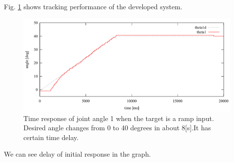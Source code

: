 \documentclass{llncs}
\begin{document}
Fig. \ref{fig:angle_tracking} shows tracking performance of the developed system.
\begin{figure}[tb]
	\centering
	\includegraphics[width=.70\textwidth]{./figure/plot/0208_3_0-20.pdf}
	\caption{Time response of joint angle 1 when the target is a ramp input. Desired angle changes from 0 to 40 degrees in about 8[s].It has certain time delay.}
	\label{fig:angle_tracking}
\end{figure}
We can see delay of initial response in the graph.
\end{document}
